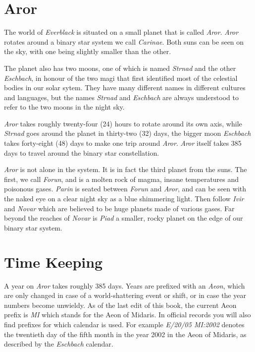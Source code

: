 \twocolumn
\section{Aror}

The world of \emph{Everblack} is situated on a small planet that is
called \emph{Aror}. \emph{Aror} rotates around a binary star system we
call \emph{Carinae}. Both suns can be seen on the sky, with one being
slightly smaller than the other.

The planet also has two moons, one of which is named \emph{Strnad} and
the other \emph{Eschbach}, in honour of the two magi that first
identified most of the celestial bodies in our solar sytem. They have
many different names in different cultures and languages, but the
names \emph{Strnad} and \emph{Eschbach} are always understood to refer
to the two moons in the night sky.

\emph{Aror} takes roughly twenty-four (24) hours to rotate around its
own axis, while \emph{Strnad} goes around the planet in thirty-two
(32) days, the bigger moon \emph{Eschbach} takes forty-eight (48) days
to make one trip around \emph{Aror}. \emph{Aror} itself takes 385 days
to travel around the binary star constellation.

\emph{Aror} is not alone in the system. It is in fact the third planet
from the suns. The first, we call \emph{Forun}, and is a molten rock
of magma, insane temperatures and poisonous gases. \emph{Parin} is
seated between \emph{Forun} and \emph{Aror}, and can be seen with the
naked eye on a clear night sky as a blue shimmering light. Then follow
\emph{Ivir} and \emph{Novar} which are believed to be huge planets made
of various gases. Far beyond the reaches of \emph{Novar} is
\emph{Piad} a smaller, rocky planet on the edge of our binary star
system.

\section{Time Keeping}

A year on \emph{Aror} takes roughly 385 days. Years are prefixed with an
\emph{Aeon}, which are only changed in case of a world-shattering event
or shift, or in case the year numbers become unwieldy. As of the last
edit of this book, the current Aeon prefix is \emph{MI} which stands for
the Aeon of Midaris. In official records you will also find prefixes for
which calendar is used. For example \emph{E/20/05 MI:2002} denotes the
twentieth day of the fifth month in the year 2002 in the Aeon of
Midaris, as described by the \emph{Eschbach} calendar.

